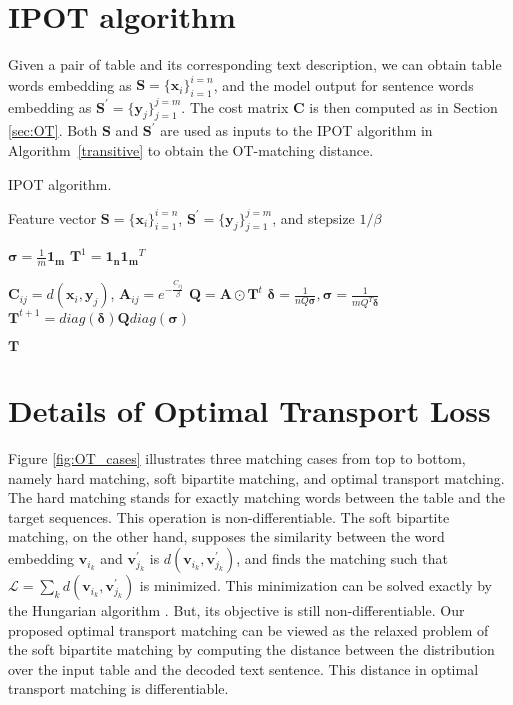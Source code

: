 \documentclass[11pt,a4paper]{article}
\begin{document}
\section{IPOT algorithm}\label{app:IPOT}

Given a pair of table and its corresponding text description, we can obtain table words embedding as $\bm{S} = \{\bm{x}_i\}_{i=1}^{i=n}$, and the model output for 
sentence words embedding as $\bm{S}^{\prime} = \{\bm{y}_j\}_{j=1}^{j=m}$. The cost matrix $\bm{C}$ is then computed as in Section \ref{sec:OT}. Both $\bm{S}$ and $\bm{S}^{\prime}$ are used as inputs to the IPOT algorithm in Algorithm~\ref{transitive} to obtain the OT-matching distance.


\begin{algorithm}[ht!]
	\caption{IPOT algorithm.}\label{transitive}
	\begin{algorithmic}
	\REQUIRE Feature vector $\bm{S} = \{\bm{x}_i\}_{i=1}^{i=n}$, $\bm{S}^{\prime} = \{\bm{y}_j\}_{j=1}^{j=m}$, and stepsize $1/\beta$
	
	\STATE $\bm{\sigma} = \frac{1}{m} \bm{1_m}$ $\bm{T}^{1} = \bm{1_n} \bm{1_m}^T$
	
	\STATE $\bm{C}_{ij} = d(\bm{x}_i, \bm{y}_j)$, $\bm{A}_{ij} = e^{-\frac{C_{ij}}{\beta}}$
	   \STATE $\bm{Q} = \bm{A} \odot \bm{T}^{t}$
	      \STATE $\bm{\delta} = \frac{1}{n Q \bm{\sigma}}, \bm{\sigma} =\frac{1}{m Q^{T} \bm{\delta} }$
	   \ENDFOR
	   \STATE $\bm{T}^{t+1} = diag(\bm{\delta})\bm{Q} diag(\bm{\sigma})$
	\ENDFOR

	\RETURN $\bm{T}$


	
	\end{algorithmic}
\end{algorithm}




\section{Details of Optimal Transport Loss} \label{app:OTloss}
Figure \ref{fig:OT_cases} illustrates three matching cases from top to bottom, namely hard matching, soft bipartite matching, and optimal transport matching. The hard matching stands for exactly matching words between the table and the target sequences. This operation is non-differentiable. The soft bipartite matching, on the other hand, supposes the similarity between the word embedding $\mathbf{v}_{i_{k}}$ and $\mathbf{v}_{j_{k}}^{\prime}$ is $d(\mathbf{v}_{i_{k}}, \mathbf{v}_{j_{k}}^{\prime})$, and finds the matching such that $\mathcal{L} = \sum_{k} d(\mathbf{v}_{i_{k}}, \mathbf{v}_{j_{k}}^{\prime}) $ is minimized. This minimization can be solved exactly by the Hungarian algorithm \cite{kuhn1955}. But, its objective is still non-differentiable. Our proposed optimal transport matching can be viewed as the relaxed problem of the soft bipartite matching by computing the distance between the distribution over the input table and the decoded text sentence. This distance in optimal transport matching is differentiable.
\end{document}
